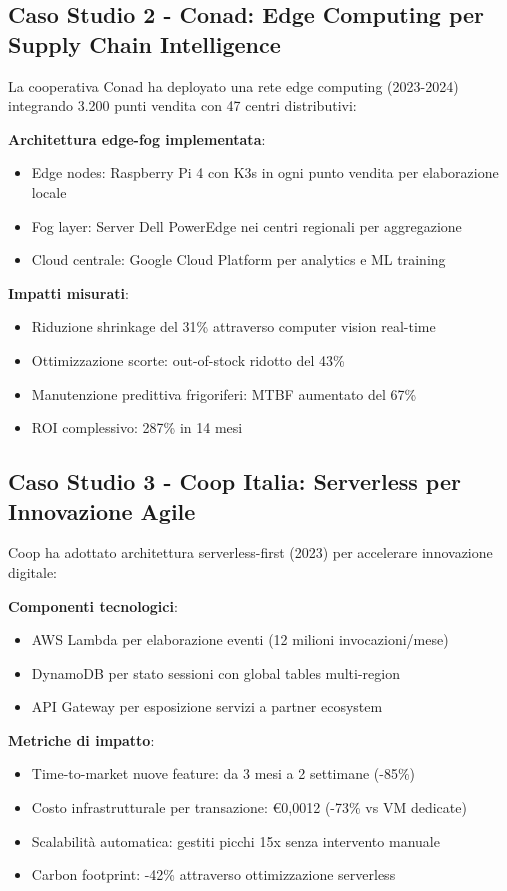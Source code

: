 \subsection{Caso Studio 2 - Conad: Edge Computing per Supply Chain Intelligence}

La cooperativa Conad ha deployato una rete edge computing (2023-2024) integrando 3.200 punti vendita con 47 centri distributivi:

\textbf{Architettura edge-fog implementata}:
\begin{itemize}
\item Edge nodes: Raspberry Pi 4 con K3s in ogni punto vendita per elaborazione locale
\item Fog layer: Server Dell PowerEdge nei centri regionali per aggregazione
\item Cloud centrale: Google Cloud Platform per analytics e ML training
\end{itemize}

\textbf{Impatti misurati}:
\begin{itemize}
\item Riduzione shrinkage del 31\% attraverso computer vision real-time
\item Ottimizzazione scorte: out-of-stock ridotto del 43\%
\item Manutenzione predittiva frigoriferi: MTBF aumentato del 67\%
\item ROI complessivo: 287\% in 14 mesi
\end{itemize}

\subsection{Caso Studio 3 - Coop Italia: Serverless per Innovazione Agile}

Coop ha adottato architettura serverless-first (2023) per accelerare innovazione digitale:

\textbf{Componenti tecnologici}:
\begin{itemize}
\item AWS Lambda per elaborazione eventi (12 milioni invocazioni/mese)
\item DynamoDB per stato sessioni con global tables multi-region
\item API Gateway per esposizione servizi a partner ecosystem
\end{itemize}

\textbf{Metriche di impatto}:
\begin{itemize}
\item Time-to-market nuove feature: da 3 mesi a 2 settimane (-85\%)
\item Costo infrastrutturale per transazione: €0,0012 (-73\% vs VM dedicate)
\item Scalabilità automatica: gestiti picchi 15x senza intervento manuale
\item Carbon footprint: -42\% attraverso ottimizzazione serverless
\end{itemize}

